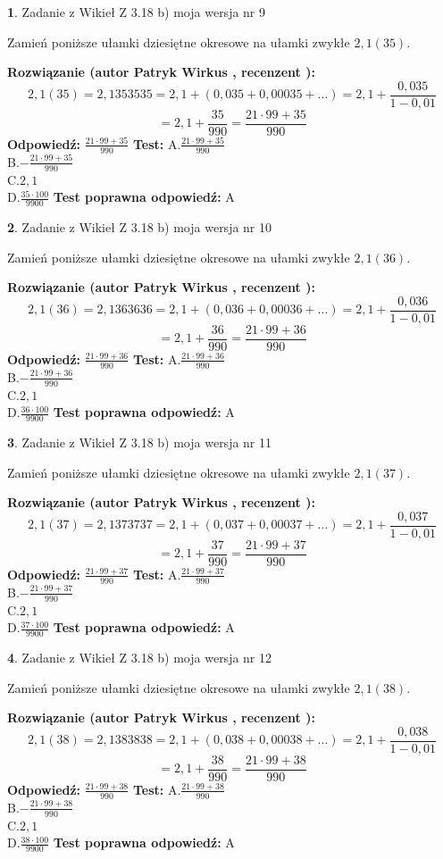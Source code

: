 \documentclass[12pt, a4paper]{article}
\theoremstyle{definition} %
\newtheorem{zad}{}
\newcommand{\zadStart}[1]{\begin{zad}#1\newline}
\newcommand{\zadStop}{\end{zad}}
\newcommand{\rozwStart}[2]{\noindent \textbf{Rozwiązanie (autor #1 , recenzent #2): }\newline}
\newcommand{\rozwStop}{\newline}
\newcommand{\odpStart}{\noindent \textbf{Odpowiedź:}\newline}
\newcommand{\odpStop}{\newline}
\newcommand{\testStart}{\noindent \textbf{Test:}\newline}
\newcommand{\testStop}{\newline}
\newcommand{\kluczStart}{\noindent \textbf{Test poprawna odpowiedź:}\newline}
\newcommand{\kluczStop}{\newline}
\begin{document}
\zadStart{Zadanie z Wikieł Z 3.18 b) moja wersja nr 9}

Zamień poniższe ułamki dziesiętne okresowe na ułamki zwykłe $2,1(35)$.
\zadStop
\rozwStart{Patryk Wirkus}{}
$$2,1(35)=2,1353535=2,1+(0,035+0,00035+...)=2,1+\frac{0,035}{1-0,01}$$
$$=2,1+\frac{35}{990}=\frac{21\cdot99+35}{990}$$
\rozwStop
\odpStart
$\frac{21\cdot99+35}{990}$
\odpStop
\testStart
A.$\frac{21\cdot99+35}{990}$\\ B.$-\frac{21\cdot99+35}{990}$\\ C.$2,1$\\ D.$\frac{35\cdot100}{9900}$
\testStop
\kluczStart
A
\kluczStop



\zadStart{Zadanie z Wikieł Z 3.18 b) moja wersja nr 10}

Zamień poniższe ułamki dziesiętne okresowe na ułamki zwykłe $2,1(36)$.
\zadStop
\rozwStart{Patryk Wirkus}{}
$$2,1(36)=2,1363636=2,1+(0,036+0,00036+...)=2,1+\frac{0,036}{1-0,01}$$
$$=2,1+\frac{36}{990}=\frac{21\cdot99+36}{990}$$
\rozwStop
\odpStart
$\frac{21\cdot99+36}{990}$
\odpStop
\testStart
A.$\frac{21\cdot99+36}{990}$\\ B.$-\frac{21\cdot99+36}{990}$\\ C.$2,1$\\ D.$\frac{36\cdot100}{9900}$
\testStop
\kluczStart
A
\kluczStop



\zadStart{Zadanie z Wikieł Z 3.18 b) moja wersja nr 11}

Zamień poniższe ułamki dziesiętne okresowe na ułamki zwykłe $2,1(37)$.
\zadStop
\rozwStart{Patryk Wirkus}{}
$$2,1(37)=2,1373737=2,1+(0,037+0,00037+...)=2,1+\frac{0,037}{1-0,01}$$
$$=2,1+\frac{37}{990}=\frac{21\cdot99+37}{990}$$
\rozwStop
\odpStart
$\frac{21\cdot99+37}{990}$
\odpStop
\testStart
A.$\frac{21\cdot99+37}{990}$\\ B.$-\frac{21\cdot99+37}{990}$\\ C.$2,1$\\ D.$\frac{37\cdot100}{9900}$
\testStop
\kluczStart
A
\kluczStop



\zadStart{Zadanie z Wikieł Z 3.18 b) moja wersja nr 12}

Zamień poniższe ułamki dziesiętne okresowe na ułamki zwykłe $2,1(38)$.
\zadStop
\rozwStart{Patryk Wirkus}{}
$$2,1(38)=2,1383838=2,1+(0,038+0,00038+...)=2,1+\frac{0,038}{1-0,01}$$
$$=2,1+\frac{38}{990}=\frac{21\cdot99+38}{990}$$
\rozwStop
\odpStart
$\frac{21\cdot99+38}{990}$
\odpStop
\testStart
A.$\frac{21\cdot99+38}{990}$\\ B.$-\frac{21\cdot99+38}{990}$\\ C.$2,1$\\ D.$\frac{38\cdot100}{9900}$
\testStop
\kluczStart
A
\kluczStop
\end{document}
